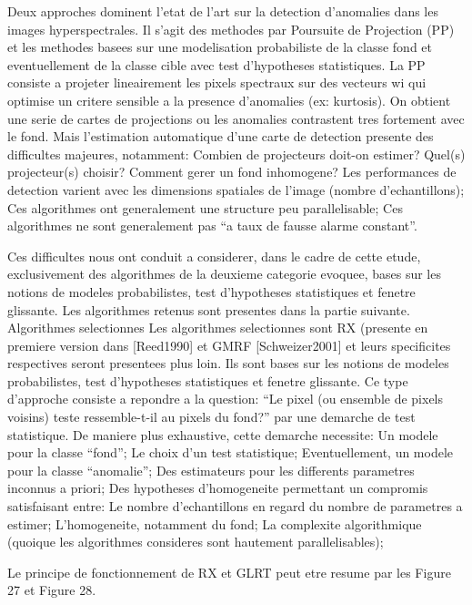 Deux approches dominent l'etat de l'art sur la detection d'anomalies
dans les images hyperspectrales. Il s'agit des methodes par Poursuite
de Projection (PP) et les methodes basees sur une modelisation
probabiliste de la classe fond et eventuellement de la classe cible
avec test d'hypotheses statistiques.  La PP consiste a projeter
lineairement les pixels spectraux sur des vecteurs wi qui optimise un
critere sensible a la presence d'anomalies (ex: kurtosis). On obtient
une serie de cartes de projections ou les anomalies contrastent tres
fortement avec le fond. Mais l'estimation automatique d'une carte de
detection presente des difficultes majeures, notamment: Combien de
projecteurs doit-on estimer?  Quel(s) projecteur(s) choisir?  Comment
gerer un fond inhomogene?  Les performances de detection varient avec
les dimensions spatiales de l'image (nombre d'echantillons); Ces
algorithmes ont generalement une structure peu parallelisable; Ces
algorithmes ne sont generalement pas ``a taux de fausse alarme
  constant''.

Ces difficultes nous ont conduit a considerer, dans le cadre de cette
etude, exclusivement des algorithmes de la deuxieme categorie evoquee,
bases sur les notions de modeles probabilistes, test d'hypotheses
statistiques et fenetre glissante. Les algorithmes retenus sont
presentes dans la partie suivante.  Algorithmes selectionnes Les
algorithmes selectionnes sont RX (presente en premiere version dans
[Reed1990] et GMRF [Schweizer2001] et leurs specificites respectives
seront presentees plus loin. Ils sont bases sur les notions de modeles
probabilistes, test d'hypotheses statistiques et fenetre glissante.
Ce type d'approche consiste a repondre a la question: ``Le pixel (ou
  ensemble de pixels voisins) teste ressemble-t-il au pixels du
  fond?'' par une demarche de test statistique. De maniere plus
exhaustive, cette demarche necessite: Un modele pour la classe
``fond''; Le choix d'un test statistique; Eventuellement, un modele
pour la classe ``anomalie''; Des estimateurs pour les differents
parametres inconnus a priori; Des hypotheses d'homogeneite permettant
un compromis satisfaisant entre: Le nombre d'echantillons en regard du
nombre de parametres a estimer; L'homogeneite, notamment du fond; La
complexite algorithmique (quoique les algorithmes consideres sont
hautement parallelisables);

Le principe de fonctionnement de RX et GLRT peut etre resume par les
Figure 27 et Figure 28.

